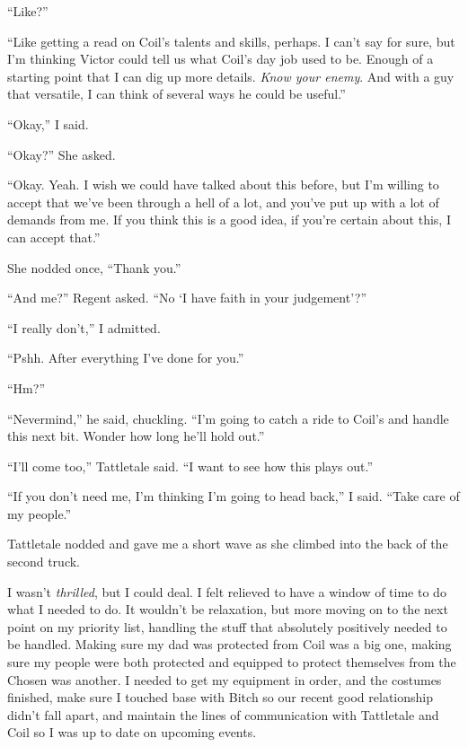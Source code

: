 ``Like?''



``Like getting a read on Coil's talents and skills, perhaps.  I can't say for sure, but I'm thinking Victor could tell us what Coil's day job used to be.  Enough of a starting point that I can dig up more details.  \emph{Know your enemy}.  And with a guy that versatile, I can think of several ways he could be useful.''



``Okay,'' I said.



``Okay?''  She asked.



``Okay.  Yeah.  I wish we could have talked about this before, but I'm willing to accept that we've been through a hell of a lot, and you've put up with a lot of demands from me.  If you think this is a good idea, if you're certain about this, I can accept that.''



She nodded once, ``Thank you.''



``And me?'' Regent asked.  ``No `I have faith in your judgement'?''



``I really don't,'' I admitted.



``Pshh.  After everything I've done for you.''



``Hm?''



``Nevermind,'' he said, chuckling.  ``I'm going to catch a ride to Coil's and handle this next bit.  Wonder how long he'll hold out.''



``I'll come too,'' Tattletale said.  ``I want to see how this plays out.''



``If you don't need me, I'm thinking I'm going to head back,'' I said.  ``Take care of my people.''



Tattletale nodded and gave me a short wave as she climbed into the back of the second truck.



I wasn't \emph{thrilled}, but I could deal.  I felt relieved to have a window of time to do what I needed to do.  It wouldn't be relaxation, but more moving on to the next point on my priority list, handling the stuff that absolutely positively needed to be handled.  Making sure my dad was protected from Coil was a big one, making sure my people were both protected and equipped to protect themselves from the Chosen was another.  I needed to get my equipment in order, and the costumes finished, make sure I touched base with Bitch so our recent good relationship didn't fall apart, and maintain the lines of communication with Tattletale and Coil so I was up to date on upcoming events.



